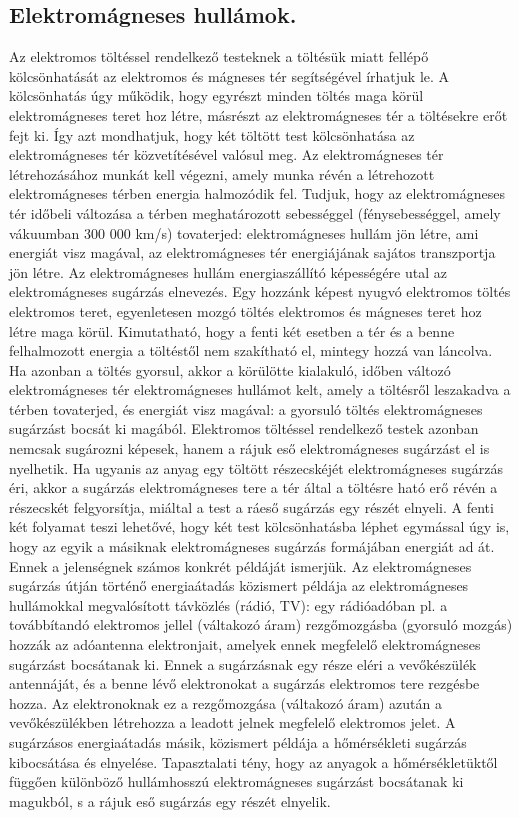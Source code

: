 \subsection{Elektromágneses hullámok. }
Az elektromos töltéssel rendelkező testeknek a töltésük miatt fellépő kölcsönhatását az elektromos és mágneses tér segítségével írhatjuk le. A kölcsönhatás úgy működik, hogy egyrészt minden töltés maga körül elektromágneses teret hoz létre, másrészt az elektromágneses tér a töltésekre erőt fejt ki. Így azt mondhatjuk, hogy két töltött test kölcsönhatása az elektromágneses tér közvetítésével valósul meg. Az elektromágneses tér létrehozásához munkát kell végezni, amely munka révén a létrehozott elektromágneses térben energia halmozódik fel. Tudjuk, hogy az elektromágneses tér időbeli változása a térben meghatározott sebességgel (fénysebességgel, amely vákuumban 300 000 km/s) tovaterjed: elektromágneses hullám jön létre, ami energiát visz magával, az elektromágneses tér energiájának sajátos transzportja jön létre. Az elektromágneses hullám energiaszállító képességére utal az elektromágneses sugárzás elnevezés. Egy hozzánk képest nyugvó elektromos töltés elektromos teret, egyenletesen mozgó töltés elektromos és mágneses teret hoz létre maga körül. Kimutatható, hogy a fenti két esetben a tér és a benne felhalmozott energia a töltéstől nem szakítható el, mintegy hozzá van láncolva. Ha azonban a töltés gyorsul, akkor a körülötte kialakuló, időben változó elektromágneses tér elektromágneses hullámot kelt, amely a töltésről leszakadva a térben tovaterjed, és energiát visz magával: a gyorsuló töltés elektromágneses sugárzást bocsát ki magából. Elektromos töltéssel rendelkező testek azonban nemcsak sugározni képesek, hanem a rájuk eső elektromágneses sugárzást el is nyelhetik. Ha ugyanis az anyag egy töltött részecskéjét elektromágneses sugárzás éri, akkor a sugárzás elektromágneses tere a tér által a töltésre ható erő révén a részecskét felgyorsítja, miáltal a test a ráeső sugárzás egy részét elnyeli. A fenti két folyamat teszi lehetővé, hogy két test kölcsönhatásba léphet egymással úgy is, hogy az egyik a másiknak elektromágneses sugárzás formájában energiát ad át. Ennek a jelenségnek számos konkrét példáját ismerjük. Az elektromágneses sugárzás útján történő energiaátadás közismert példája az elektromágneses hullámokkal megvalósított távközlés (rádió, TV): egy rádióadóban pl. a továbbítandó elektromos jellel (váltakozó áram) rezgőmozgásba (gyorsuló mozgás) hozzák az adóantenna elektronjait, amelyek ennek megfelelő elektromágneses sugárzást bocsátanak ki. Ennek a sugárzásnak egy része eléri a vevőkészülék antennáját, és a benne lévő elektronokat a sugárzás elektromos tere rezgésbe hozza. Az elektronoknak ez a rezgőmozgása (váltakozó áram) azután a vevőkészülékben létrehozza a leadott jelnek megfelelő elektromos jelet. A sugárzásos energiaátadás másik, közismert példája a hőmérsékleti sugárzás kibocsátása és elnyelése. Tapasztalati tény, hogy az anyagok a hőmérsékletüktől függően különböző hullámhosszú elektromágneses sugárzást bocsátanak ki magukból, s a rájuk eső sugárzás egy részét elnyelik.

